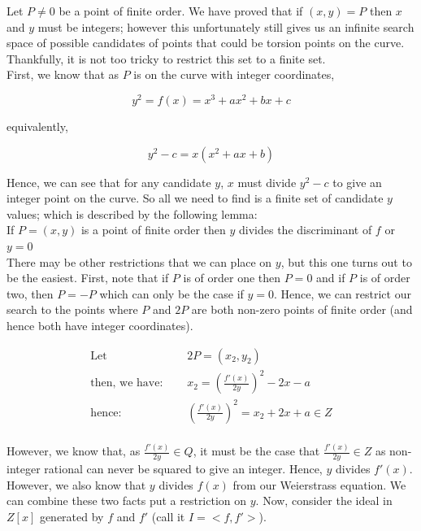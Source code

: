 \documentclass{article}
\begin{document}
Let $P \neq 0$ be a point of finite order. We have proved that if $(x, y) = P$ then $x$ and $y$ must be integers; however this unfortunately still gives us an infinite search space of possible candidates of points that could be torsion points on the curve. Thankfully, it is not too tricky to restrict this set to a finite set.\\

First, we know that as $P$ is on the curve with integer coordinates, 

\[ y^2 = f(x) = x^3 + a x^2 + b x + c \]

equivalently,

\[ y^2 - c = x(x^2 + a x + b) \]

Hence, we can see that for any candidate $y$, $x$ must divide $y^2 - c$ to give an integer point on the curve. So all we need to find is a finite set of candidate $y$ values; which is described by the following lemma:\\

If $P = (x, y)$ is a point of finite order then $y$ divides the discriminant of $f$ or $y = 0$\\

There may be other restrictions that we can place on $y$, but this one turns out to be the easiest. First, note that if $P$ is of order one then $P = 0$ and if $P$ is of order two, then $P = -P$ which can only be the case if $y = 0$. Hence, we can restrict our search to the points where $P$ and $2P$ are both non-zero points of finite order (and hence both have integer coordinates).

\begin{align*}
    \text{Let } \quad & 2P = (x_2, y_2)\\
    \text{then, we have: } \quad & x_2 = \left( \frac{f'(x)}{2y} \right) ^2 - 2x - a\\
    \text{hence: } \quad & \left( \frac{f'(x)}{2y} \right) ^2 = x_2 + 2x + a \in Z\\
\end{align*}

However, we know that, as $\frac{f'(x)}{2y} \in Q$, it must be the case that $\frac{f'(x)}{2y} \in Z$ as non-integer rational can never be squared to give an integer. Hence, $y$ divides $f'(x)$. However, we also know that $y$ divides $f(x)$ from our Weierstrass equation. We can combine these two facts put a restriction on $y$. Now, consider the ideal in $Z[x]$ generated by $f$ and $f'$ (call it $I = <f, f'>$).\\
\end{document}
